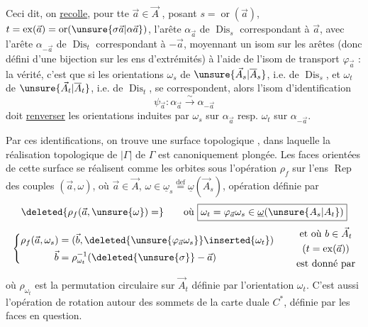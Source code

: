 Ceci dit, on \uline{recolle}, pour tte $\vec a\in\vec A$ , posant $s=\operatorname{or}(\vec a)$, $t=\operatorname{ex}(\vec a)=\operatorname{or}(\unsure{\sigma\vec a|\alpha\vec a})$,  l'arête $\alpha_{\vec a}$ de $\operatorname{Dis}_s$ correspondant à $\vec a$, avec l'arête $\alpha_{-\vec a}$ de $\operatorname{Dis}_t$ correspondant à $-\vec a$, moyennant un isom   sur les arêtes (donc défini  d'une bijection sur les ens d'extrémités)   à l'aide de l'isom de transport $\varphi_{\vec a}$ : la vérité, c'est que si les orientations $\omega_s$ de  $\unsure{\vec A_s|\overline A_s}$, i.e. de $\operatorname{Dis}_s$, et $\omega_t$ de $\unsure{\vec A_t|\overline A_t}$, i.e. de $\operatorname{Dis}_t$, se correspondent, alors l'isom d'identification
\[
\psi_{\vec a}:\alpha_{\vec a}\xrightarrow{\sim}\alpha_{-\vec a}
\]
doit  \uline{renverser} les orientations induites par $\omega_s$ sur $\alpha_{\vec a}$ resp. $\omega_t$ sur $\alpha_{-\vec a}$.


Par ces identifications, on trouve une surface topologique , dans laquelle la réalisation topologique de $|\Gamma|$ de $\Gamma$ est canoniquement plongée. Les faces orientées de cette surface se réalisent comme les orbites sous l'opération $\rho_f$ sur l'ens  $\operatorname{Rep}$ des couples $(\vec a,\omega)$, où $\vec a\in\vec A$, $\omega\in\underline\omega_s\overset{\mathrm{def}}=\underline\omega(\vec A_s)$, opération définie par
\[
\deleted{\rho_f(\vec a,\unsure{\omega})=}
\qquad\text{où }\boxed{\omega_t=\varphi_{\vec a}\omega_s\in\underline\omega(\unsure{A_s|A_t})}
\]
\[
\left\{\begin{aligned}
\rho_f(\vec a,\omega_s)&=(\vec b,\deleted{\unsure{\varphi_{\vec a}\omega_s}}\inserted{\omega_t})\\
\vec b&=\rho_{\omega_t}^{-1}(\deleted{\unsure{\sigma}}-\vec a)
\end{aligned}\right.
\qquad\begin{gathered}\text{et où }b\in\vec A_t\\(t=\operatorname{ex}(\vec a))\\\text{est donné par}\end{gathered}
\]
où $\rho_{\omega_t}$ est la permutation circulaire sur $\vec A_t$ définie par l'orientation $\omega_t$. C'est aussi l'opération de rotation autour des sommets de la carte duale $C^*$, définie par les faces en question.

